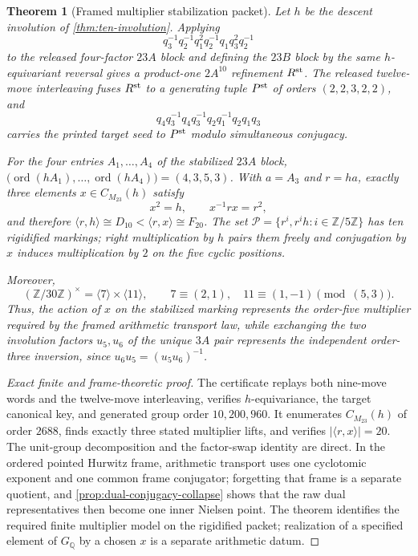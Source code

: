 \documentclass[11pt]{article}
\newtheorem{theorem}{Theorem}[section]
\theoremstyle{remark}
\newcommand{\Q}{\mathbb Q}
\newcommand{\ord}{\operatorname{ord}}
\begin{document}
\begin{theorem}[Framed multiplier stabilization packet]\label{thm:arithmetic-stabilization}
Let $h$ be the descent involution of \cref{thm:ten-involution}.  Applying
\[
 q_3^{-1}q_2^{-1}q_1^2q_2^{-1}q_1q_3^2q_2^{-1}
\]
to the released four-factor $23A$ block and defining the $23B$ block by the same $h$-equivariant reversal gives a product-one $2A^{10}$ refinement $R^{\rm st}$.  The released twelve-move interleaving fuses $R^{\rm st}$ to a generating tuple $P^{\rm st}$ of orders $(2,2,3,2,2)$, and
\[
 q_4q_3^{-1}q_4q_3^{-1}q_2q_1^{-1}q_2q_1q_3
\]
carries the printed target seed to $P^{\rm st}$ modulo simultaneous conjugacy.

For the four entries $A_1,\ldots,A_4$ of the stabilized $23A$ block,
$\bigl(\ord(hA_1),\ldots,\ord(hA_4)\bigr)=(4,3,5,3)$.  With $a=A_3$ and $r=ha$, exactly three elements $x\in C_{M_{23}}(h)$ satisfy
\[
 x^2=h,\qquad x^{-1}rx=r^2,
\]
and therefore $\langle r,h\rangle\cong D_{10}<\langle r,x\rangle\cong F_{20}$.  The set
$\mathcal P=\{r^i,r^ih:i\in\mathbb Z/5\mathbb Z\}$ has ten rigidified markings; right multiplication by $h$ pairs them freely and conjugation by $x$ induces multiplication by $2$ on the five cyclic positions.

Moreover,
\[
 (\mathbb Z/30\mathbb Z)^\times=\langle7\rangle\times\langle11\rangle,
 \qquad 7\equiv(2,1),\quad11\equiv(1,-1)\pmod{(5,3)}.
\]
Thus, the action of $x$ on the stabilized marking represents the order-five multiplier required by the framed arithmetic transport law, while exchanging the two involution factors $u_5,u_6$ of the unique $3A$ pair represents the independent order-three inversion, since $u_6u_5=(u_5u_6)^{-1}$.
\end{theorem}

\begin{proof}[Exact finite and frame-theoretic proof]
The certificate replays both nine-move words and the twelve-move interleaving, verifies $h$-equivariance, the target canonical key, and generated group order $10{,}200{,}960$.  It enumerates $C_{M_{23}}(h)$ of order $2688$, finds exactly three stated multiplier lifts, and verifies $|\langle r,x\rangle|=20$.  The unit-group decomposition and the factor-swap identity are direct.  In the ordered pointed Hurwitz frame, arithmetic transport uses one cyclotomic exponent and one common frame conjugator; forgetting that frame is a separate quotient, and \cref{prop:dual-conjugacy-collapse} shows that the raw dual representatives then become one inner Nielsen point.  The theorem identifies the required finite multiplier model on the rigidified packet; realization of a specified element of $G_{\Q}$ by a chosen $x$ is a separate arithmetic datum.
\end{proof}
\end{document}
